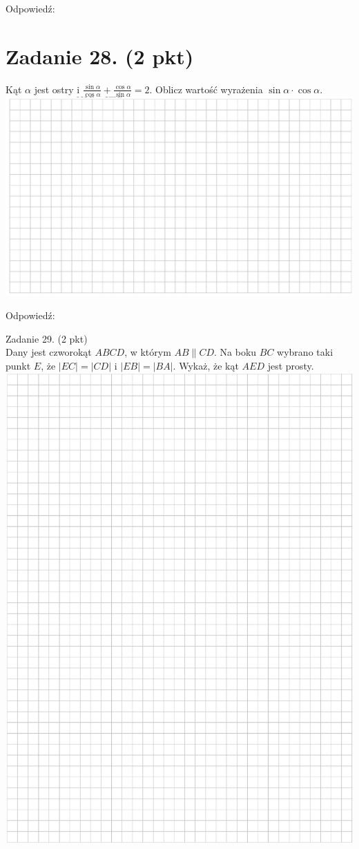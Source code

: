 \documentclass[10pt]{article}
\begin{document}
Odpowiedź:

\section*{Zadanie 28. (2 pkt)}
Kąt \(\alpha\) jest ostry i \(\frac{\sin \alpha}{\cos \alpha}+\frac{\cos \alpha}{\sin \alpha}=2\). Oblicz wartość wyrażenia \(\sin \alpha \cdot \cos \alpha\).\\
\includegraphics[max width=\textwidth, center]{2024_11_21_5b6b7ffa9006e3f448adg-12}

Odpowiedź:

Zadanie 29. (2 pkt)\\
Dany jest czworokąt \(A B C D\), w którym \(A B \| C D\). Na boku \(B C\) wybrano taki punkt \(E\), że \(|E C|=|C D|\) i \(|E B|=|B A|\). Wykaż, że kąt \(A E D\) jest prosty.\\
\includegraphics[max width=\textwidth, center]{2024_11_21_5b6b7ffa9006e3f448adg-13}
\end{document}
